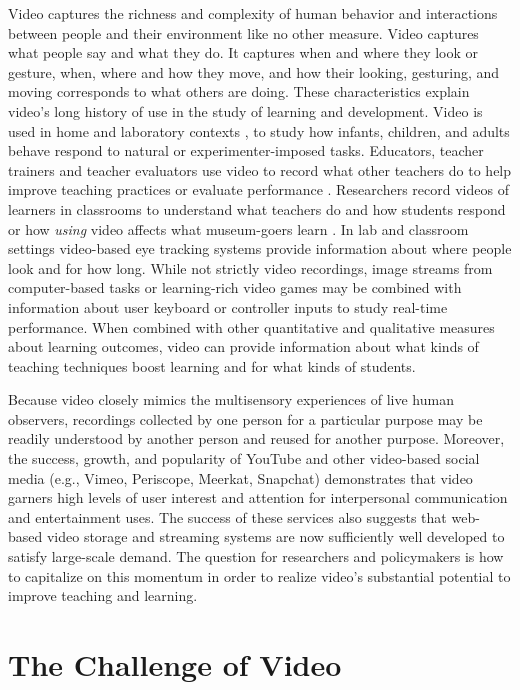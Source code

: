 \documentclass[letterpaper,man,apacite]{apa6}
\begin{document}
Video captures the richness and complexity of human behavior and interactions between people and their environment like no other measure.
Video captures what people say and what they do.
It captures when and where they look or gesture, when, where and how they move, and how their looking, gesturing, and moving corresponds to what others are doing.
These characteristics explain video's long history of use \cite{Goldman2007,Scott2011} in the study of learning and development.
Video is used in home and laboratory contexts \cite{Karasik2014}, to study how infants, children, and adults behave respond to natural or experimenter-imposed tasks.
Educators, teacher trainers and teacher evaluators use video to record what other teachers do to help improve teaching practices or evaluate performance \cite{Blomberg2014, Masats20111151, Baecher2013189}.
Researchers record videos of learners in classrooms \cite{Alibali2012} to understand what teachers do and how students respond or how \emph{using} video affects what museum-goers learn \cite{Bakken2015}.
In lab \cite{Kretch2014} and classroom \cite{Mason2015, Prieto:2014:STC:2669485.2669543} settings video-based eye tracking systems provide information about where people look and for how long.
While not strictly video recordings, image streams from computer-based tasks or learning-rich video games may be combined with information about user keyboard or controller inputs to study real-time performance.
When combined with other quantitative and qualitative measures about learning outcomes, video can provide information about what kinds of teaching techniques boost learning and for what kinds of students.

Because video closely mimics the multisensory experiences of live human observers, recordings collected by one person for a particular purpose may be readily understood by another person and reused for another purpose.
Moreover, the success, growth, and popularity of YouTube and other video-based social media (e.g., Vimeo, Periscope, Meerkat, Snapchat) demonstrates that video garners high levels of user interest and attention for interpersonal communication and entertainment uses.
The success of these services also suggests that web-based video storage and streaming systems are now sufficiently well developed to satisfy large-scale demand.
The question for researchers and policymakers is how to capitalize on this momentum in order to realize video's substantial potential to improve teaching and learning. 

\section{The Challenge of Video}
\end{document}

